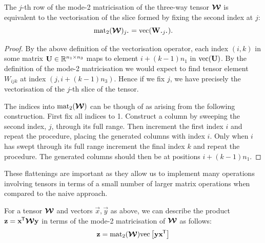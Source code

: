{\begin{lem}
The \(j\)-th row of the mode-2 matricisation of the three-way tensor \(\bm{\mathcal{W}}\)
is equivalent to the vectorisation of the slice formed by fixing the second index at \(j\):
\begin{equation}\label{eq:matlemstatement}
	\matr_2 (\tensor{W})_{j \midbullet} = \vect(\mat{W}_{\midbullet j \midbullet}).
\end{equation}
\label{lem:matricise}
\end{lem}
\begin{proof}
By the above definition of the vectorisation operator, each index \((i, k)\) in some matrix
\(\mathbf{U} \in \mathbb{R}^{n_1\times n_3}\) maps to element \(i + (k-1)n_1\) in
\(\operatorname{vec}(\mathbf{U})\). By the definition of the mode-2 matricisation we would expect to
find tensor element \(W_{ijk}\) at index \((j, i + (k-1)n_3)\). Hence if we fix \(j\), we have
precisely the vectorisation of the \(j\)-th slice of the tensor.

The indices into \(\operatorname{mat}_2(\bm{\mathcal{W}})\) can be though of as arising from the following construction.
First fix all indices to 1. Construct a column by sweeping the second index, \(j\),
through its full range. Then increment the first index \(i\) and repeat the procedure, placing
the generated columns with index \(i\). Only when \(i\) has swept through its full range
increment the final index \(k\) and repeat the procedure. The generated columns should then be
at positions \(i + (k-1)n_1\).
\end{proof}

These flattenings are important as they allow us to
implement many operations involving tensors in terms of a small number of larger matrix
operations when compared to the naive approach.

\begin{lem}\label{lem:outerprod}
For a tensor \(\bm{\mathcal{W}}\) and vectors \(\vec{x}, \vec{y}\) as above,
we can describe the product \(\mathbf{z} = \mathbf{x}^{\mkern-1.5mu\mathsf{T}}\bm{\mathcal{W}}\mathbf{y}\) in terms of the
mode-2 matricisation of \(\bm{\mathcal{W}}\) as 
follows:
\begin{align}
	\mathbf{z} = \operatorname{mat}_2(\bm{\mathcal{W}})\mathrm{vec}\left[\mathbf{y}\mathbf{x}^{\mkern-1.5mu\mathsf{T}}\right]
	\label{eq:bilinearouter}
\end{align}
\end{lem}

}
